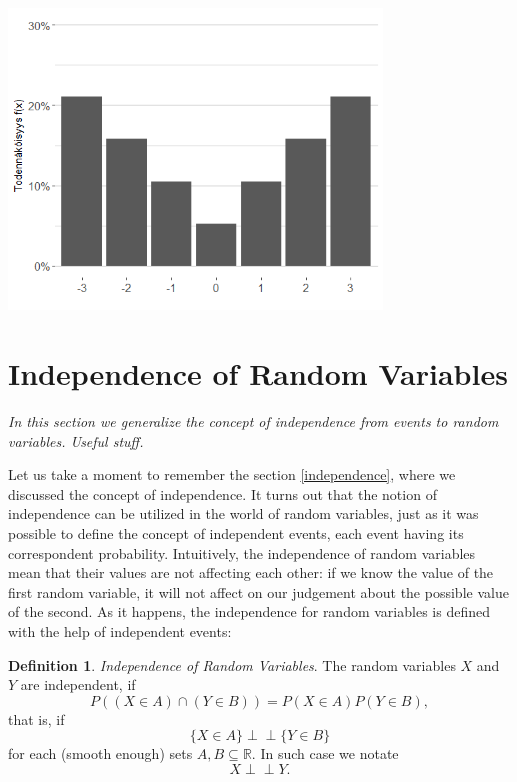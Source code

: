 \documentclass[12pt,a4paper,leqno]{report}
\newcommand{\R}{\mathbb{R}}
\def\independent{\perp\!\!\!\perp}
\theoremstyle{plain}
\theoremstyle{definition}
\newtheorem{maar}[equation]{Definition}
\begin{document}
\begin{center}
\includegraphics[height = 8cm]{var_b.png}
\end{center}

\section{Independence of Random Variables}

\emph{In this section we generalize the concept of independence from events to random variables. Useful stuff.}

Let us take a moment to remember the section \ref{independence}, where we discussed the concept of independence. It turns out that the notion of independence can be utilized in the world of random variables, just as it was possible to define the concept of independent events, each event having its correspondent probability. Intuitively, the independence of random variables mean that their values are not affecting each other: if we know the value of the first random variable, it will not affect on our judgement about the possible value of the second. As it happens, the independence for random variables is defined with the help of independent events:

\begin{maar}
\emph{Independence of Random Variables}.   The random variables $X$ and $Y$ are independent, if 
\[
P((X \in A) \cap (Y \in B)) = P(X \in A) P(Y \in B),
\]
that is, if
\[
\{X \in A\} \independent \{Y \in B\}
\]
for each (smooth enough) sets $A,B \subseteq \R$. In such case we notate
\[
X \independent Y.
\] 
\end{maar}
\end{document}
